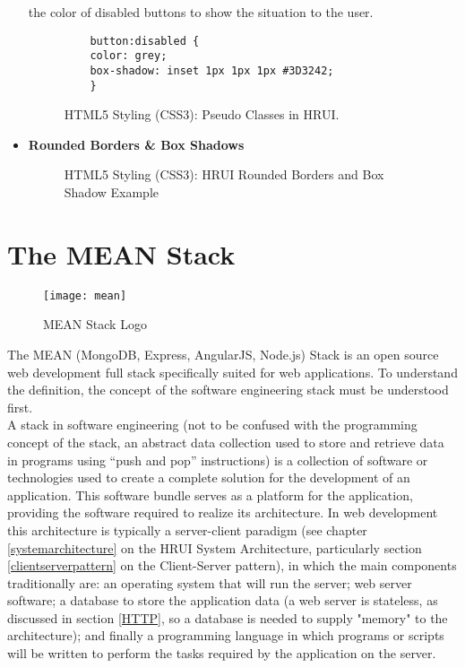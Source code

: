 \begin{itemize}
  the color of disabled buttons to show the situation to the user.
  \begin{figure}[h]
    \centering
    \begin{verbatim}
    button:disabled {
    color: grey;
    box-shadow: inset 1px 1px 1px #3D3242;
    }
    \end{verbatim}
    \caption{HTML5 Styling (CSS3): Pseudo Classes in HRUI.}
  \end{figure}
  \item \textbf{Rounded Borders \& Box Shadows}
  \begin{figure}[H]
    \begin{center}
    \end{center}
    \caption{HTML5 Styling (CSS3): HRUI Rounded Borders and Box Shadow Example}
  \end{figure}
\end{itemize}

\section{The MEAN Stack} \label{TheMEANStack}
\begin{figure}[H]
    \begin{center}
      \texttt{[image: mean]}
    \end{center}
    \caption{MEAN Stack Logo}
  \end{figure}
The MEAN (MongoDB, Express, AngularJS, Node.js) Stack is an open source web development full stack specifically suited for web applications. To understand the definition, the concept of the software engineering stack must be understood first.\\

A stack in software engineering (not to be confused with the programming concept of the stack, an abstract data collection
used to store and retrieve data in programs using ``push and pop'' instructions) is a collection of software or technologies
used to create a complete solution for the development of an application. This software bundle serves as a platform for the
application, providing the software required to realize its architecture. In web development this architecture is typically a
server-client paradigm (see chapter \ref{systemarchitecture} on the HRUI System Architecture, particularly section 
\ref{clientserverpattern} on the Client-Server pattern), in which the main components traditionally are: an operating system that will run the server; web server software; a database to store the application data (a web server is stateless, as discussed in section \ref{HTTP}, so a database is needed to supply "memory" to the architecture); and finally a programming language in which programs or scripts will be written to perform the tasks required by the application on the server.\\

